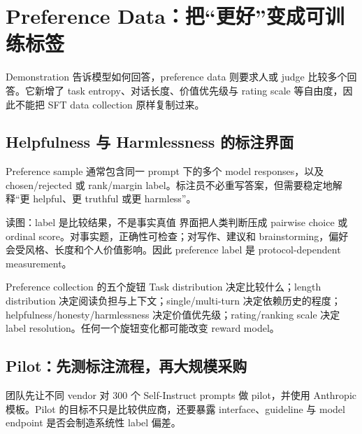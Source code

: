 \section{Preference Data：把“更好”变成可训练标签}

Demonstration 告诉模型如何回答，preference data 则要求人或 judge 比较多个回答。它新增了 task entropy、对话长度、价值优先级与 rating scale 等自由度，因此不能把 SFT data collection 原样复制过来。

\subsection{Helpfulness 与 Harmlessness 的标注界面}

Preference sample 通常包含同一 prompt 下的多个 model responses，以及 chosen/rejected 或 rank/margin label。标注员不必重写答案，但需要稳定地解释“更 helpful、更 truthful 或更 harmless”。


\begin{knowledgebox}{读图：label 是比较结果，不是事实真值}
界面把人类判断压成 pairwise choice 或 ordinal score。对事实题，正确性可检查；对写作、建议和 brainstorming，偏好会受风格、长度和个人价值影响。因此 preference label 是 protocol-dependent measurement。
\end{knowledgebox}


\begin{importantbox}{Preference collection 的五个旋钮}
Task distribution 决定比较什么；length distribution 决定阅读负担与上下文；single/multi-turn 决定依赖历史的程度；helpfulness/honesty/harmlessness 决定价值优先级；rating/ranking scale 决定 label resolution。任何一个旋钮变化都可能改变 reward model。
\end{importantbox}


\subsection{Pilot：先测标注流程，再大规模采购}

团队先让不同 vendor 对 300 个 Self-Instruct prompts 做 pilot，并使用 Anthropic 模板。Pilot 的目标不只是比较供应商，还要暴露 interface、guideline 与 model endpoint 是否会制造系统性 label 偏差。

